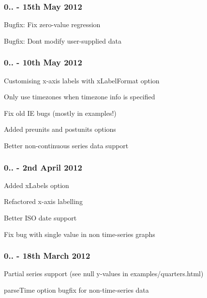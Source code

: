 \subsubsection*{0.. -\/ 15th May 2012}


\begin{DoxyItemize}
\item Bugfix\+: Fix zero-\/value regression
\item Bugfix\+: Don\textquotesingle{}t modify user-\/supplied data
\end{DoxyItemize}

\subsubsection*{0.. -\/ 10th May 2012}


\begin{DoxyItemize}
\item Customising x-\/axis labels with {\ttfamily x\+Label\+Format} option
\item Only use timezones when timezone info is specified
\item Fix old IE bugs (mostly in examples!)
\item Added {\ttfamily preunits} and {\ttfamily postunits} options
\item Better non-\/continuous series data support
\end{DoxyItemize}

\subsubsection*{0.. -\/ 2nd April 2012}


\begin{DoxyItemize}
\item Added {\ttfamily x\+Labels} option
\item Refactored x-\/axis labelling
\item Better I\+SO date support
\item Fix bug with single value in non time-\/series graphs
\end{DoxyItemize}

\subsubsection*{0.. -\/ 18th March 2012}


\begin{DoxyItemize}
\item Partial series support (see {\ttfamily null} y-\/values in {\ttfamily examples/quarters.\+html})
\item {\ttfamily parse\+Time} option bugfix for non-\/time-\/series data
\end{DoxyItemize}

